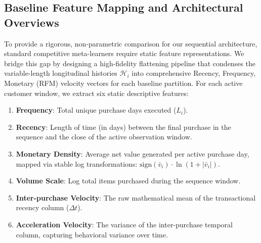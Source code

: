 \documentclass[10pt, conference]{IEEEtran}
\begin{document}
\subsection{Baseline Feature Mapping and Architectural Overviews}
To provide a rigorous, non-parametric comparison for our sequential architecture, standard competitive meta-learners require static feature representations. We bridge this gap by designing a high-fidelity flattening pipeline that condenses the variable-length longitudinal histories $\mathbf{\mathcal{H}}_i$ into comprehensive Recency, Frequency, Monetary (RFM) velocity vectors for each baseline partition. For each active customer window, we extract six static descriptive features:
\begin{enumerate}
    \item \textbf{Frequency}: Total unique purchase days executed ($L_i$).
    \item \textbf{Recency}: Length of time (in days) between the final purchase in the sequence and the close of the active observation window.
    \item \textbf{Monetary Density}: Average net value generated per active purchase day, mapped via stable log transformations: $\text{sign}(\bar{v}_i) \cdot \ln(1 + |\bar{v}_i|)$.
    \item \textbf{Volume Scale}: Log total items purchased during the sequence window.
    \item \textbf{Inter-purchase Velocity}: The raw mathematical mean of the transactional recency column ($\Delta t$).
    \item \textbf{Acceleration Velocity}: The variance of the inter-purchase temporal column, capturing behavioral variance over time.
\end{enumerate}
\end{document}
